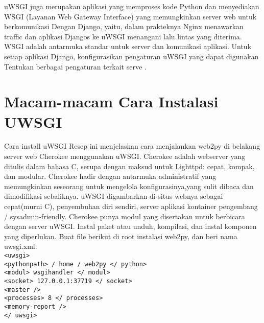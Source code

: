 \documentclass[12pt, times new roman, a4paper]{Article}
\begin{document}
	uWSGI juga merupakan aplikasi yang memproses kode Python dan menyediakan WSGI (Layanan Web Gateway Interface) yang memungkinkan server web untuk berkomunikasi Dengan Django, yaitu, dalam prakteknya Nginx menawarkan traffic dan aplikasi Djangos ke uWSGI menangani lalu lintas yang diterima. WSGI adalah antarmuka standar untuk server dan komunikasi aplikasi. Untuk setiap aplikasi Django, konfigurasikan pengaturan uWSGI yang dapat digunakan Tentukan berbagai pengaturan terkait serve \cite{wood2018ccbuilder}.\\
	
	\section{Macam-macam Cara Instalasi UWSGI}
	Cara install uWSGI Resep ini menjelaskan cara menjalankan web2py di belakang server web Cherokee menggunakan uWSGI. Cherokee adalah webserver yang ditulis dalam bahasa C, serupa dengan maksud untuk Lighttpd: cepat, kompak, dan modular. Cherokee hadir dengan antarmuka administratif yang memungkinkan seseorang untuk mengelola konfigurasinya,yang sulit dibaca dan dimodifikasi sebaliknya. uWSGI digambarkan di situs webnya sebagai cepat(murni C), penyembuhan diri sendiri, server aplikasi kontainer pengembang / sysadmin-friendly. Cherokee punya modul yang disertakan untuk berbicara dengan server uWSGI. Instal paket atau unduh, kompilasi, dan instal komponen yang diperlukan. Buat file berikut di root instalasi web2py, dan beri nama uwsgi.xml:\\
	
\verb|<uwsgi>| \\
\verb|<pythonpath> / home / web2py </ python>| \\
\verb|<modul> wsgihandler </ modul>| \\
\verb|<socket> 127.0.0.1:37719 </ socket>| \\
\verb|<master />| \\
\verb|<processes> 8 </ processes>| \\
\verb|<memory-report />| \\
\verb|</ uwsgi>| \\
\end{document}
